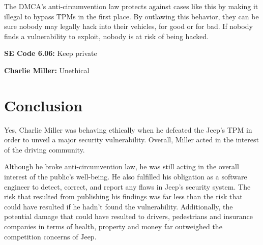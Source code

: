 \documentclass[12pt]{article}
\begin{document}
\begin{multicols}{2}
The DMCA's anti-circumvention law protects against cases like this by making it illegal to bypass TPMs in the first place.\cite{DMCA} By outlawing this behavior, they can be sure nobody may legally hack into their vehicles, for good or for bad. If nobody finds a vulnerability to exploit, nobody is at risk of being hacked.\cite{chris}

\begin{framed}
\textbf{SE Code 6.06:} Keep private

\textbf{Charlie Miller:} Unethical
\end{framed}


\section{Conclusion}

Yes, Charlie Miller was behaving ethically when he defeated the Jeep's TPM in order to unveil a major security vulnerability. Overall, Miller acted in the interest of the driving community. 

Although he broke anti-circumvention law, he was still acting in the overall interest of the public's well-being. He also fulfilled his obligation as a software engineer to detect, correct, and report any flaws in Jeep's security system. The risk that resulted from publishing his findings was far less than the risk that could have resulted if he hadn't found the vulnerability. Additionally, the potential damage that could have resulted to drivers, pedestrians and insurance companies in terms of health, property and money far outweighed the competition concerns of Jeep.

\end{multicols}

\nocite{*}



\newpage

\end{document}

